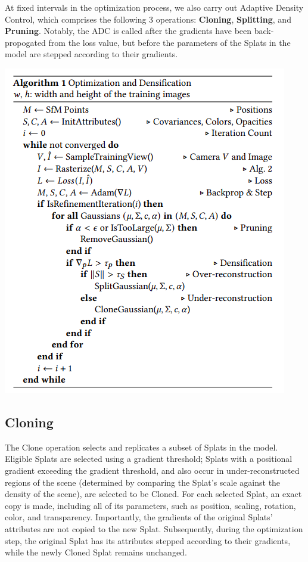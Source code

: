 \documentclass[11pt]{report}
\begin{document}
At fixed intervals in the optimization process, we also carry out Adaptive Density Control, which comprises the following 3 operations: \textbf{Cloning}, \textbf{Splitting}, and \textbf{Pruning}. Notably, the ADC is called after the gradients have been back-propogated from the loss value, but before the parameters of the Splats in the model are stepped according to their gradients.

\begin{center}
\begin{minipage}{0.6\linewidth}
\includegraphics[width = \linewidth]{assets/original_optimization_and_densification}
\end{minipage}
\end{center}

\subsection{Cloning}
The Clone operation selects and replicates a subset of Splats in the model. Eligible Splats are selected using a gradient threshold; Splats with a positional gradient exceeding the gradient threshold, and also occur in under-reconstructed regions of the scene (determined by comparing the Splat's scale against the density of the scene), are selected to be Cloned. For each selected Splat, an exact copy is made, including all of its parameters, such as position, scaling, rotation, color, and transparency. Importantly, the gradients of the original Splats' attributes are not copied to the new Splat. Subsequently, during the optimization step, the original Splat has its attributes stepped according to their gradients, while the newly Cloned Splat remains unchanged.
\end{document}
